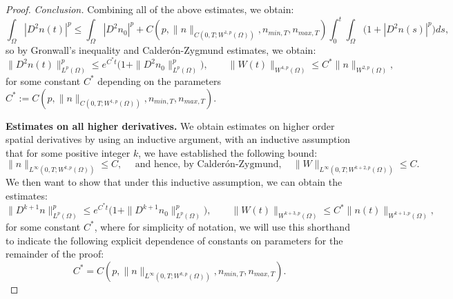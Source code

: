 \documentclass[10pt,a4paper]{amsart}
\begin{document}
\begin{proof}
\noindent \textit{Conclusion.} Combining all of the above estimates, we obtain:
\begin{equation*}
\int_{\Omega} |D^{2}n(t)|^{p} \le \int_{\Omega} |D^{2}n_{0}|^{p} + C(p, \|n\|_{C(0, T; W^{1, p}(\Omega))}, n_{min, T}, n_{max, T}) \int_{0}^{t} \int_{\Omega} \Big(1 + |D^{2}n(s)|^{p}\Big) ds,
\end{equation*}
so by Gronwall's inequality and Calder\'{o}n-Zygmund estimates, we obtain:
\begin{equation*}
\|D^{2}n(t)\|_{L^{p}(\Omega)}^{p} \le e^{C^{*}t}\Big(1 + \|D^{2}n_{0}\|_{L^{p}(\Omega)}^{p}\Big), \qquad \|W(t)\|_{W^{4, p}(\Omega)} \le C^{*}\|n\|_{W^{2, p}(\Omega)},
\end{equation*} 
for some constant $C^{*}$ depending on the parameters $C^{*} := C(p, \|n\|_{C(0, T; W^{1, p}(\Omega))}, n_{min, T}, n_{max, T})$.

\medskip

\noindent \textbf{Estimates on all higher derivatives.} We obtain estimates on higher order spatial derivatives by using an inductive argument, with an inductive assumption that for some positive integer $k$, we have established the following bound:
\begin{equation}\label{inductivek}
\|n\|_{L^{\infty}(0, T; W^{k, p}(\Omega))} \le C, \quad \text{ and hence, by Calder\'{o}n-Zygmund}, \quad \|W\|_{L^{\infty}(0, T; W^{k + 2, p}(\Omega))} \le C.
\end{equation}
We then want to show that under this inductive assumption, we can obtain the estimates:
\begin{equation}\label{inductivestep}
\|D^{k + 1}n\|_{L^{p}(\Omega)}^{p} \le e^{C^{*}t}\Big(1 + \|D^{k + 1}n_{0}\|_{L^{p}(\Omega)}^{p}\Big), \qquad \|W(t)\|_{W^{k + 3, p}(\Omega)} \le C^{*}\|n(t)\|_{W^{k + 1, p}(\Omega)},
\end{equation}
for some constant $C^{*}$, where for simplicity of notation, we will use this shorthand to indicate the following explicit dependence of constants on parameters for the remainder of the proof:
\begin{equation}\label{Cstardepend}
C^{*} = C(p, \|n\|_{L^{\infty}(0, T; W^{k, p}(\Omega))}, n_{min, T}, n_{max, T}).
\end{equation}


\end{proof}
\end{document}
